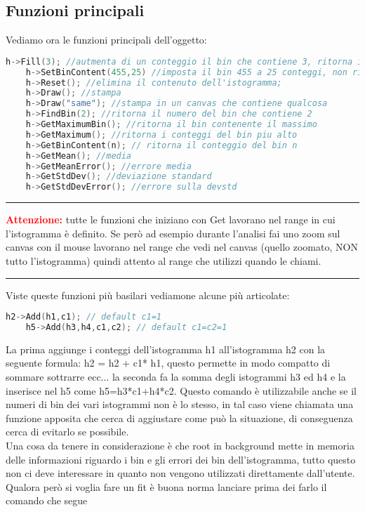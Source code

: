\subsection{Funzioni principali}
Vediamo ora le funzioni principali dell'oggetto:
\begin{lstlisting}[language=C++,label={cod1},mathescape=true,breaklines=true]
	h->Fill(3); //autmenta di un conteggio il bin che contiene 3, ritorna il numero del bin in questione;
	h->SetBinContent(455,25) //imposta il bin 455 a 25 conteggi, non ritorna nulla;
	h->Reset(); //elimina il contenuto dell'istogramma;
	h->Draw(); //stampa
	h->Draw("same"); //stampa in un canvas che contiene qualcosa
	h->FindBin(2); //ritorna il numero del bin che contiene 2
	h->GetMaximumBin(); //ritorna il bin contenente il massimo
	h->GetMaximum(); //ritorna i conteggi del bin piu alto
	h->GetBinContent(n); // ritorna il conteggio del bin n
	h->GetMean(); //media 
	h->GetMeanError(); //errore media  
	h->GetStdDev(); //deviazione standard
	h->GetStdDevError(); //errore sulla devstd
\end{lstlisting}
{\color{red} \rule{\linewidth}{0.5mm}}
\textcolor{red}{\textbf{Attenzione:}} tutte le funzioni che iniziano con Get lavorano nel range in cui l'istogramma è definito. Se però ad esempio durante l'analisi fai uno zoom sul canvas con il mouse lavorano nel range che vedi nel canvas (quello zoomato, NON tutto l'istogramma) quindi attento al range che utilizzi quando le chiami.\\
{\color{red} \rule{\linewidth}{0.5mm}}
Viste queste funzioni più basilari vediamone alcune più articolate:\\
\begin{lstlisting}[language=C++,label={cod1},mathescape=true,breaklines=true]
	h2->Add(h1,c1); // default c1=1
	h5->Add(h3,h4,c1,c2); // default c1=c2=1
\end{lstlisting}
La prima aggiunge i conteggi dell'istogramma h1 all'istogramma h2 con la seguente formula: h2 = h2 + c1* h1, questo permette in modo compatto di sommare sottrarre ecc... la seconda fa la somma degli istogrammi h3 ed h4 e la inserisce nel h5 come h5=h3*c1+h4*c2. Questo comando è utilizzabile anche se il numeri di bin dei vari istogrammi non è lo stesso, in tal caso viene chiamata una funzione apposita che cerca di aggiustare come può la situazione, di conseguenza cerca di evitarlo se possibile.\\
Una cosa da tenere in considerazione è che root in background mette in memoria delle informazioni riguardo i bin e gli errori dei bin dell'istogramma, tutto questo non ci deve interessare in quanto non vengono utilizzati direttamente dall'utente. Qualora però si voglia fare un fit è buona norma lanciare prima dei farlo il comando che segue

